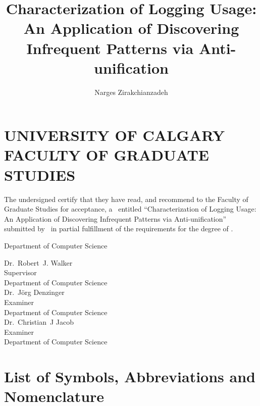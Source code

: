 \documentclass{ucalgthes1}
\title{Characterization of Logging Usage:\\An Application of Discovering Infrequent Patterns via Anti-unification}
\author{Narges Zirakchianzadeh}
\theoremstyle{plain}
\theoremstyle{definition}
\newcommand{\thestitle}{Characterization of Logging Usage: An Application of Discovering Infrequent Patterns via Anti-unification}
\begin{document}
\makethesistitle
{}     %
\setcounter{page}{1}


\chapter*{UNIVERSITY OF CALGARY \\ FACULTY OF GRADUATE STUDIES}
\thispagestyle{empty}
The undersigned certify that they have read, and recommend
to the Faculty of Graduate Studies for acceptance, a \Thesis\ entitled
``\thestitle'' submitted by \Author\
in partial fulfillment of the requirements for the degree of
\Degree.\\

%
%

\begin{signing}{Department of Computer Science}

\newsigncolumn

\signline
Dr.~Robert~J. Walker \\
Supervisor \\
Department of Computer Science  \\


\signline
Dr.~J{\"o}rg Denzinger \\
Examiner \\
Department of  Computer Science \\

\signline
Dr.~Christian~J Jacob \\
Examiner \\
Department of  Computer Science \\
\end{signing}

\newpage
{}
{}


\newpage
{}
{}


\begin{singlespace}
\newpage
{}
\tableofcontents
\pagestyle{plain}
\newpage
{}
\listoftables
\pagestyle{plain}
\newpage
{}
\listoffigures
\pagestyle{plain}
\clearpage
\clearpage          %
\end{singlespace}
\newpage
{}
\chapter*{\bf{List of Symbols, Abbreviations and Nomenclature}\hfill} 
\listofsymbols
\pagestyle{plain}
\clearpage
\end{document}
